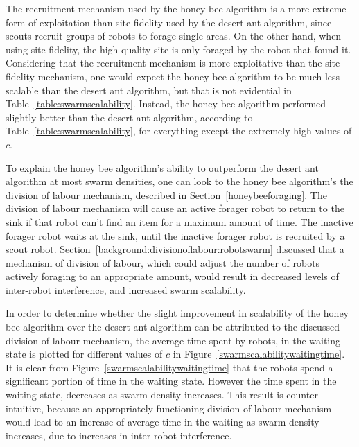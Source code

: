 The recruitment mechanism used by the honey bee algorithm is a more extreme form of exploitation than site fidelity used by the desert ant algorithm, since scouts recruit groups of robots to forage single areas. On the other hand, when using site fidelity, the high quality site is only foraged by the robot that found it. Considering that the recruitment mechanism is more exploitative than the site fidelity mechanism, one would expect the honey bee algorithm to be much less scalable than the desert ant algorithm, but that is not evidential in Table~\ref{table:swarmscalability}. Instead, the honey bee algorithm performed slightly better than the desert ant algorithm, according to Table~\ref{table:swarmscalability}, for everything except the extremely high values of $c$. 

To explain the honey bee algorithm's ability to outperform the desert ant algorithm at most swarm densities, one can look to the honey bee algorithm's the division of labour mechanism, described in Section~\ref{honeybeeforaging}. The division of labour mechanism will cause an active forager robot to return to the sink if that robot can't find an item for a maximum amount of time. The inactive forager robot waits at the sink, until the inactive forager robot is recruited by a scout robot. Section~\ref{background:divisionoflabour:robotswarm} discussed that a mechanism of division of labour, which could adjust the number of robots actively foraging to an appropriate amount, would result in decreased levels of inter-robot interference, and increased swarm scalability.

In order to determine whether the slight improvement in scalability of the honey bee algorithm over the desert ant algorithm can be attributed to the discussed division of labour mechanism, the average time spent by robots, in the waiting state is plotted for different values of $c$ in Figure~\ref{swarmscalabilitywaitingtime}. It is clear from Figure~\ref{swarmscalabilitywaitingtime} that the robots spend a significant portion of time in the waiting state. However the time spent in the waiting state, decreases as swarm density increases. This result is counter-intuitive, because an appropriately functioning division of labour mechanism would lead to an increase of average time in the waiting as swarm density increases, due to increases in inter-robot interference. 



